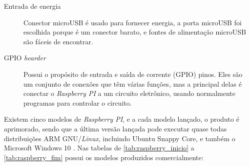 \documentclass[
	12pt,				%
	openright,			%
	twoside,			%
	a4paper,			%
	chapter=TITLE,		%
	english,			%
	brazil				%
	]{abntex2}
\begin{document}
\begin{description}
\item[Entrada de energia] 
 Conector microUSB é usado para fornecer energia, a porta microUSB foi escolhida porque é um conector barato, e fontes de alimentação microUSB são fáceis de encontrar.

\item[GPIO \textit{hearder}]
Possui o propósito de entrada e saída de corrente (GPIO) pinos. Eles são um conjunto de conexões que têm várias funções, mas a principal delas é conectar o \textit{Raspberry PI} a um circuito eletrônico, usando normalmente programas para controlar o circuito.


\end{description}

Existem cinco modelos de \textit{Raspberry PI}, e a cada modelo lançado, o produto é aprimorado, sendo que a última versão lançada pode executar quase todas distribuições ARM GNU/\textit{Linux}, incluindo Ubuntu Snappy Core, e também o Microsoft Windows 10 \cite{raspberrypi.org}. Nas tabelas de \ref{tab:raspberry_inicio} a \ref{tab:raspberry_fim} possui os modelos produzidos comercialmente:
\end{document}
